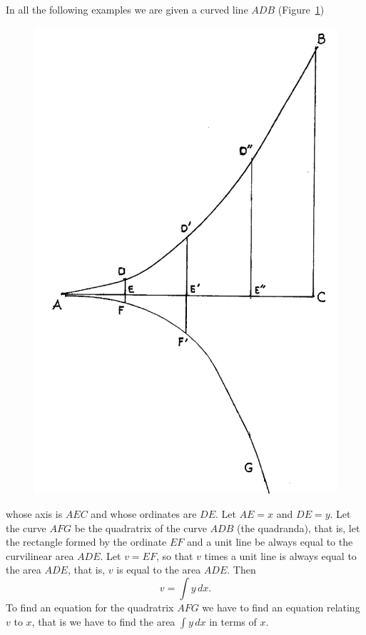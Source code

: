\documentclass[twoside,openright]{article}
\begin{document}
In all the following examples we are given a curved line $ADB$ (Figure~\ref{algquad})
\begin{figure}[htp]
\begin{center}
\includegraphics[width=.9\textwidth]{fig/Figure46}
\caption{}
\label{algquad}
\vspace{-10pt}
\end{center}
\end{figure}  whose axis is $AEC$ and whose ordinates are $DE$.  Let $AE = x$ and $DE = y$.  Let the curve $AFG$ be the quadratrix of the curve $ADB$ (the quadranda), that is, let the rectangle formed by the ordinate $EF$ and a unit line be always equal to the curvilinear area $ADE$.  Let $v = EF$, so that $v$ times a unit line is always equal to the area $ADE$, that is, $v$ is equal to the area $ADE$.  Then 
$$v = \int\!y\,dx.$$
To find an equation for the quadratrix $AFG$ we have to find an equation relating $v$ to $x$, that is we have to find the area $\int\! y\,dx$  in terms of $x$.  
\end{document}
